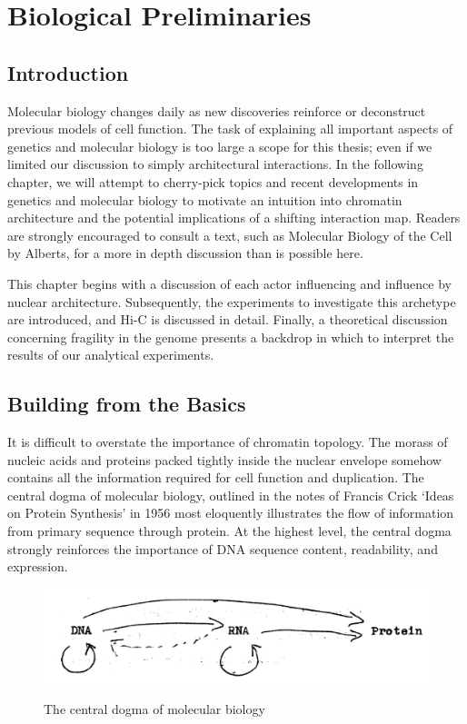 
\chapter{Biological Preliminaries}

\section*{Introduction}

Molecular biology changes daily as new discoveries reinforce or deconstruct previous models of cell function.  The task of
explaining all important aspects of genetics and molecular biology is too large a scope for this thesis; even if we limited
our discussion to simply architectural interactions.  In the following chapter, we will attempt to cherry-pick topics and recent
developments in genetics and molecular biology to motivate an intuition into chromatin architecture and the potential implications
of a shifting interaction map.  Readers are strongly encouraged to consult a text, such as Molecular Biology of the Cell by
Alberts\cite{alberts2002}, for a more in depth discussion than is possible here.

This chapter begins with a discussion of each actor influencing and influence by nuclear architecture.  Subsequently, the experiments
to investigate this archetype are introduced, and Hi-C is discussed in detail.  Finally, a theoretical discussion concerning
fragility in the genome presents a backdrop in which to interpret the results of our analytical experiments.


\section*{Building from the Basics}

It is difficult to overstate the importance of chromatin topology.  The morass of nucleic acids and proteins packed tightly inside the
nuclear envelope somehow contains all the information required for cell function and duplication.  The central dogma of molecular biology,
outlined in the notes of Francis Crick `Ideas on Protein Synthesis' in 1956\cite{crick1970} most eloquently illustrates the flow of
information from primary sequence through protein.  At the highest level, the central dogma strongly reinforces the importance of
\gls{DNA} sequence content, readability, and expression.

\begin{figure}[b]
  \centering
  \caption{The central dogma of molecular biology\cite{crick1970}}
  \includegraphics[width=\textwidth]{fig/dogma}\label{fig:dogma}
\end{figure}

